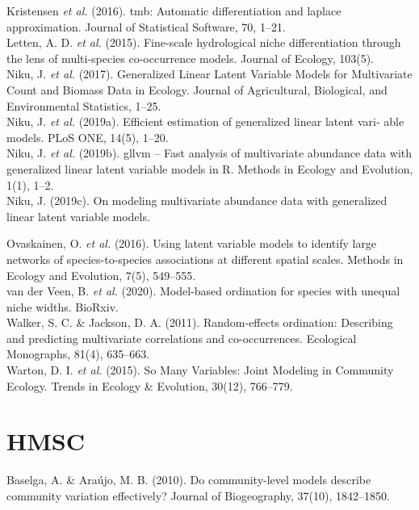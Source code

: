 \documentclass{article}
\begin{document}
Kristensen \textit{et al.} (2016). tmb: Automatic differentiation and laplace approximation. Journal of Statistical Software, 70, 1–21. \\

Letten, A. D. \textit{et al.} (2015). Fine-scale hydrological niche differentiation through the lens of multi-species co-occurrence models. Journal of Ecology, 103(5). \\ 

Niku, J. \textit{et al.} (2017). Generalized Linear Latent Variable Models for Multivariate Count and Biomass Data in Ecology. Journal of Agricultural, Biological, and Environmental Statistics, 1–25. \\

Niku, J. \textit{et al.} (2019a). Efficient estimation of generalized linear latent vari‐ able models. PLoS ONE, 14(5), 1–20.\\

Niku, J. \textit{et al.} (2019b). gllvm – Fast analysis of multivariate abundance data with generalized linear latent variable models in R. Methods in Ecology and Evolution, 1(1), 1–2. \\

Niku, J. (2019c). On modeling multivariate abundance data with generalized linear latent variable models.

Ovaskainen, O. \textit{et al.} (2016). Using latent variable models to identify large networks of species-to-species associations at different spatial scales. Methods in Ecology and Evolution, 7(5), 549–555. \\

van der Veen, B. \textit{et al.} (2020). Model-based ordination for species with unequal niche widths. BioRxiv.\\

Walker, S. C. \& Jackson, D. A. (2011). Random-effects ordination: Describing and predicting multivariate correlations and co-occurrences. Ecological Monographs, 81(4), 635–663.\\ 

Warton, D. I. \textit{et al.} (2015). So Many Variables: Joint Modeling in Community Ecology. Trends in Ecology \& Evolution, 30(12), 766–779. 

\section{HMSC}

Baselga, A. \& Araújo, M. B. (2010). Do community-level models describe community variation effectively? Journal of Biogeography, 37(10), 1842–1850.\\
\end{document}
